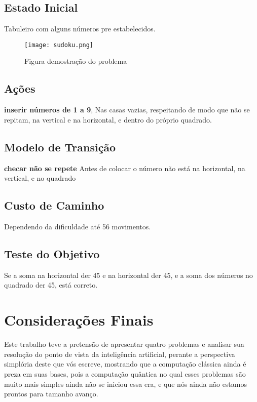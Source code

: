 \documentclass[12pt,a4paper,twocolumn]{article}
\begin{document}
\subsection{Estado Inicial}
 Tabuleiro com alguns números pre estabelecidos.
\begin{figure}[h]
   \centering
   \texttt{[image: sudoku.png]}
   \caption{Figura demostração do problema}
   \label{fig:sudoku} 
\end{figure}
 
\subsection{Ações}
 \textbf{ inserir números de 1 a 9}, Nas casas vazias, respeitando de modo que não se repitam, na vertical e na horizontal, e dentro do próprio quadrado.

\subsection{Modelo de Transição}
    \textbf{ checar não se repete}  Antes de colocar o número não está na horizontal, na vertical, e no quadrado

\subsection{Custo de Caminho}
    Dependendo da dificuldade até 56 movimentos.
\subsection{Teste do Objetivo}
Se a soma na horizontal der 45 e na horizontal der 45, e a soma dos números no quadrado der 45,  está correto. 



\section{Considerações Finais}
Este trabalho teve a pretensão de apresentar quatro problemas e analisar sua resolução do ponto de vista da inteligência artificial, perante a perspectiva simplória deste que vós escreve, mostrando que a computação clássica ainda é preza em suas bases, pois a computação quântica no qual esses problemas são muito mais simples ainda não se iniciou essa era, e que nós ainda não estamos prontos para tamanho avanço. 
\end{document}
